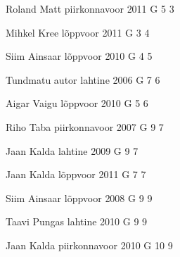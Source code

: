 \documentclass[11pt]{article}
\begin{document}
{Roland Matt} %
{piirkonnavoor} %
{2011} %
{G 5} %
{3} %
{

\ifEngHint
\fi
}

{Mihkel Kree} %
{lõppvoor} %
{2011} %
{G 3} %
{4} %
{

\ifEngHint
\fi
}

{Siim Ainsaar} %
{lõppvoor} %
{2010} %
{G 4} %
{5} %
{

\ifEngHint
\fi
}

{Tundmatu autor} %
{lahtine} %
{2006} %
{G 7} %
{6} %
{

\ifEngHint
\fi
}

{Aigar Vaigu} %
{lõppvoor} %
{2010} %
{G 5} %
{6} %
{

\ifEngHint
\fi
}

{Riho Taba} %
{piirkonnavoor} %
{2007} %
{G 9} %
{7} %
{

\ifEngHint
\fi
}

{Jaan Kalda} %
{lahtine} %
{2009} %
{G 9} %
{7} %
{

\ifEngHint
\fi
}

{Jaan Kalda} %
{lõppvoor} %
{2011} %
{G 7} %
{7} %
{

\ifEngHint
\fi
}

{Siim Ainsaar} %
{lõppvoor} %
{2008} %
{G 9} %
{9} %
{

\ifEngHint
\fi
}

{Taavi Pungas} %
{lahtine} %
{2010} %
{G 9} %
{9} %
{

\ifEngHint
\fi
}

{Jaan Kalda} %
{piirkonnavoor} %
{2010} %
{G 10} %
{9} %
{

\ifEngHint
\fi
}
\end{document}
